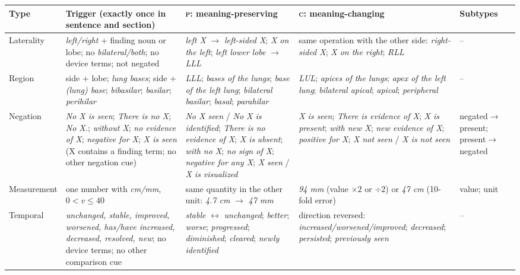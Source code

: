 \documentclass[11pt]{article}
\newcommand{\Pc}{\textsc{p}\xspace}
\newcommand{\Cc}{\textsc{c}\xspace}
\begin{document}
\begin{table}[t]
\centering
\scriptsize
\setlength{\tabcolsep}{4pt}
\begin{tabular}{p{}p{}p{}p{}p{}}
\toprule
\textbf{Type} & \textbf{Trigger (exactly once in sentence and section)} & \textbf{\Pc: meaning-preserving} & \textbf{\Cc: meaning-changing} & \textbf{Subtypes} \\
\midrule
Laterality & \emph{left/right} + finding noun or lobe; no \emph{bilateral/both}; no device terms; not negated & \emph{left X} $\to$ \emph{left-sided X}; \emph{X on the left}; \emph{left lower lobe} $\to$ \emph{LLL} & same operation with the other side: \emph{right-sided X}; \emph{X on the right}; \emph{RLL} & -- \\
Region & side + lobe; \emph{lung bases}; side + \emph{(lung) base}; \emph{bibasilar}; \emph{basilar}; \emph{perihilar} & \emph{LLL}; \emph{bases of the lungs}; \emph{base of the left lung}; \emph{bilateral basilar}; \emph{basal}; \emph{parahilar} & \emph{LUL}; \emph{apices of the lungs}; \emph{apex of the left lung}; \emph{bilateral apical}; \emph{apical}; \emph{peripheral} & -- \\
Negation & \emph{No X is seen}; \emph{There is no X}; \emph{No X.}; \emph{without X}; \emph{no evidence of X}; \emph{negative for X}; \emph{X is seen} (X contains a finding term; no other negation cue) & \emph{No X seen} / \emph{No X is identified}; \emph{There is no evidence of X}; \emph{X is absent}; \emph{with no X}; \emph{no sign of X}; \emph{negative for any X}; \emph{X seen} / \emph{X is visualized} & \emph{X is seen}; \emph{There is evidence of X}; \emph{X is present}; \emph{with new X}; \emph{new evidence of X}; \emph{positive for X}; \emph{X not seen} / \emph{X is not seen} & negated$\to$present; present$\to$negated \\
Measurement & one number with \emph{cm/mm}, $0<v\le40$ & same quantity in the other unit: \emph{4.7 cm} $\to$ \emph{47 mm} & \emph{94 mm} (value $\times2$ or $\div2$) or \emph{47 cm} (10-fold error) & value; unit \\
Temporal & \emph{unchanged, stable, improved, worsened, has/have increased, decreased, resolved, new}; no device terms; no other comparison cue & \emph{stable} $\leftrightarrow$ \emph{unchanged}; \emph{better}; \emph{worse}; \emph{progressed}; \emph{diminished}; \emph{cleared}; \emph{newly identified} & direction reversed: \emph{increased/worsened/improved}; \emph{decreased}; \emph{persisted}; \emph{previously seen} & -- \\

\end{tabular}
\end{table}
\end{document}
